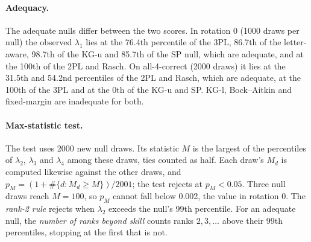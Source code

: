 \documentclass{article}
\theoremstyle{plain}
\theoremstyle{remark}
\begin{document}
\paragraph{Adequacy.} The adequate nulls differ between the two
scores. In rotation 0 (1000
draws per null) the observed $\lambda_1$ lies at the 76.4th percentile
of the 3PL, 86.7th of the letter-aware, 98.7th of the KG-u and 85.7th of
the SP null, which are adequate, and at the 100th of the 2PL and Rasch.
On all-4-correct (2000 draws) it lies at the 31.5th and 54.2nd
percentiles of the 2PL and Rasch, which are adequate, at the 100th of
the 3PL and at the 0th of the KG-u and SP. KG-l, Bock--Aitkin and
fixed-margin are inadequate for both.

\paragraph{Max-statistic test.} The test uses 2000 new null draws. Its
statistic $M$ is the largest of the percentiles of $\lambda_2$,
$\lambda_3$ and $\lambda_4$ among these draws, ties counted as half.
Each draw's $M_d$ is computed likewise against the other
draws, and $p_M=(1+\#\{d:M_d\ge M\})/2001$; the test rejects at
$p_M<0.05$. Three null draws reach $M=100$, so $p_M$ cannot fall below
0.002, the value in rotation 0. The \emph{rank-2 rule} rejects when
$\lambda_2$ exceeds the null's 99th percentile. For an adequate null,
the \emph{number of ranks beyond skill} counts ranks $2,3,\ldots$
above their 99th percentiles, stopping at the first that is not.
\end{document}
